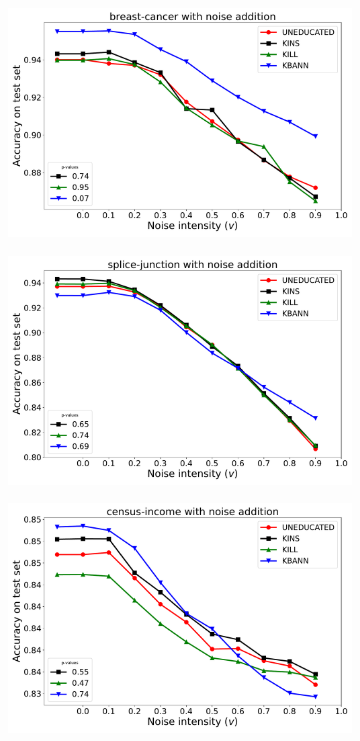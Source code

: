\begin{figure}
	\begin{subfigure}{\cellsize}
		\caption{}
		\label{fig:bcw-noise}
		\includegraphics[width=\linewidth]{figures/noise/breast-cancer/uneducated-kins-kill-kbann-accuracy-average-curves}
	\end{subfigure}\hfil
	\begin{subfigure}{\cellsize}
		\caption{}
		\label{fig:psjgs-noise}
		\includegraphics[width=\linewidth]{figures/noise/splice-junction/uneducated-kins-kill-kbann-accuracy-average-curves}
	\end{subfigure}\hfil
	\begin{subfigure}{\cellsize}
		\caption{}
		\label{fig:ci-noise}
		\includegraphics[width=\linewidth]{figures/noise/census-income/uneducated-kins-kill-kbann-accuracy-average-curves}

\end{subfigure}
\end{figure}
